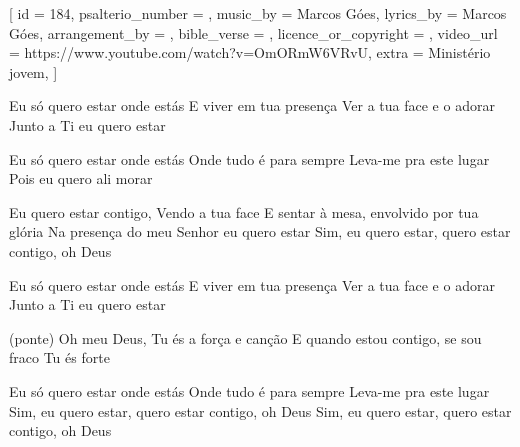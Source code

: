 [
    id                     = {184},
    psalterio_number       = {},
    music_by               = {Marcos Góes},
    lyrics_by              = {Marcos Góes},
    arrangement_by         = {},
    bible_verse            = {},
    licence_or_copyright   = {},
    video_url              = {https://www.youtube.com/watch?v=OmORmW6VRvU},
    extra                  = {Ministério jovem},
]

\beginverse
Eu só quero estar onde estás
E viver em tua presença
Ver a tua face e o adorar
Junto a Ti eu quero estar
\endverse

\beginverse
Eu só quero estar onde estás
Onde tudo é para sempre
Leva-me pra este lugar
Pois eu quero ali morar
\endverse

\beginchorus
Eu quero estar contigo,
Vendo a tua face
E sentar à mesa, envolvido por tua glória
Na presença do meu Senhor eu quero estar
Sim, eu quero estar, quero estar contigo, oh Deus
\endchorus


\beginverse
Eu só quero estar onde estás
E viver em tua presença
Ver a tua face e o adorar
Junto a Ti eu quero estar

(ponte)
Oh meu Deus, Tu és a força e canção
E quando estou contigo, se sou fraco Tu és forte
\endverse

\beginverse
Eu só quero estar onde estás
Onde tudo é para sempre
Leva-me pra este lugar
Sim, eu quero estar, quero estar contigo, oh Deus
Sim, eu quero estar, quero estar contigo, oh Deus
\endverse

\endsong
